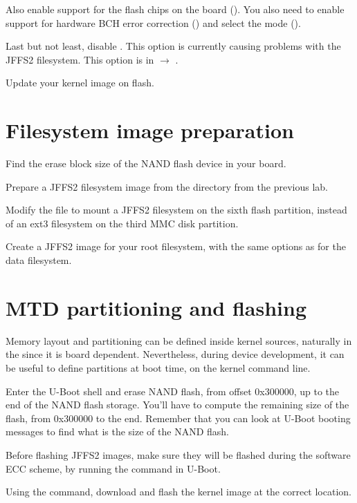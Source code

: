 Also enable support for the flash chips on the board
(). You also need to enable support for
hardware BCH error correction () and select
the  mode
().

Last but not least, disable . This option is
currently causing problems with the JFFS2 filesystem. This option is
in  $\rightarrow$
.

Update your kernel image on flash.

\section{Filesystem image preparation}

Find the erase block size of the NAND flash device in your board.

Prepare a JFFS2 filesystem image from the 
directory from the previous lab.

Modify the  file to mount a JFFS2 filesystem on
the sixth flash partition, instead of an ext3 filesystem on the third
MMC disk partition.

Create a JFFS2 image for your root filesystem, with the same options
as for the data filesystem.

\section{MTD partitioning and flashing}

Memory layout and partitioning can be defined inside kernel sources,
naturally in the  since it is
board dependent. Nevertheless, during device development, it can be
useful to define partitions at boot time, on the kernel command line.

Enter the U-Boot shell and erase NAND flash, from offset 0x300000,
up to the end of the NAND flash storage. You'll have to compute the
remaining size of the flash, from 0x300000 to the end. Remember that
you can look at U-Boot booting messages to find what is the size of
the NAND flash.

Before flashing JFFS2 images, make sure they will be flashed during
the software ECC scheme, by running the  command in
U-Boot.

Using the  command, download and flash the kernel image at
the correct location.

